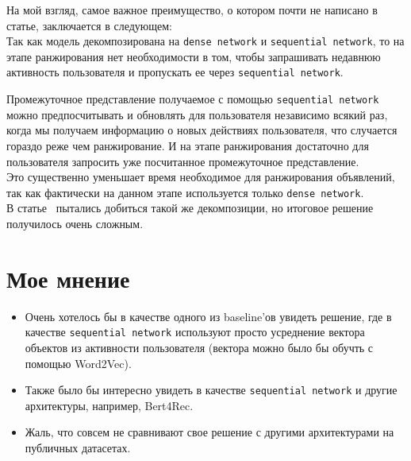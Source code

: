 На мой взгляд, самое важное преимущество, о котором почти не написано в статье, заключается в следующем: \\

Так как модель декомпозирована на \texttt{dense network} и \texttt{sequential network}, то на этапе ранжирования нет необходимости в том, чтобы запрашивать недавнюю активность пользователя и пропускать ее через \texttt{sequential network}. 

Промежуточное представление получаемое с помощью \texttt{sequential network} можно предпосчитывать и обновлять для пользователя независимо всякий раз, когда мы получаем информацию о новых действиях пользователя, что случается гораздо реже чем ранжирование. И на этапе ранжирования достаточно для пользователя запросить уже посчитанное промежуточное представление. \\

Это существенно уменьшает время необходимое для ранжирования объявлений, так как фактически на данном этапе используется только \texttt{dense network}. \\

В статье~\cite{pi2019practice} пытались добиться такой же декомпозиции, но итоговое решение получилось очень сложным.

\section{Мое мнение}

\begin{itemize}
    \item Очень хотелось бы в качестве одного из baseline'ов увидеть решение, где в качестве \texttt{sequential network} используют просто усреднение вектора объектов из активности пользователя (вектора можно было бы обучть с помощью Word2Vec).
    \item Также было бы интересно увидеть в качестве \texttt{sequential network} и другие архитектуры, например, Bert4Rec.
    \item Жаль, что совсем не сравнивают свое решение с другими архитектурами на публичных датасетах.
\end{itemize}
